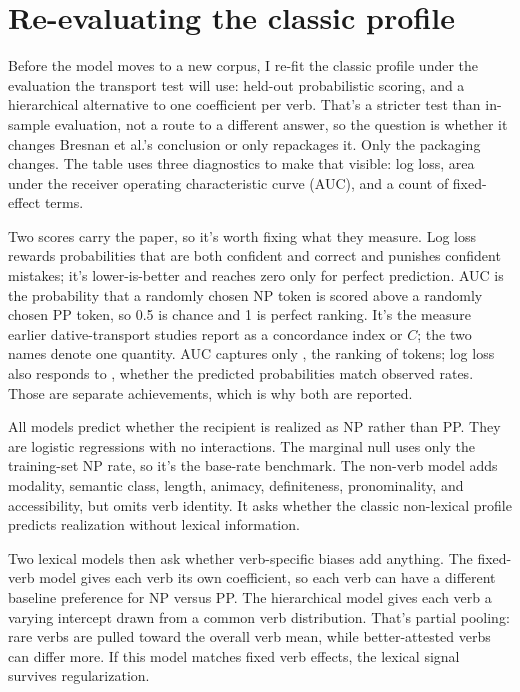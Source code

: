 \section{Re-evaluating the classic profile}

Before the model moves to a new corpus, I re-fit the classic profile under the
evaluation the transport test will use: held-out probabilistic scoring, and a
hierarchical alternative to one coefficient per verb. That's a stricter test than
in-sample evaluation, not a route to a different answer, so the question is
whether it changes Bresnan et al.'s conclusion or only repackages it. Only the
packaging changes. The table uses three diagnostics to make that visible: log
loss, area under the receiver operating characteristic curve (AUC), and a count
of fixed-effect terms.

Two scores carry the paper, so it's worth fixing what they measure. Log loss
rewards probabilities that are both confident and correct and punishes confident
mistakes; it's lower-is-better and reaches zero only for perfect prediction. AUC
is the probability that a randomly chosen NP token is scored above a randomly
chosen PP token, so 0.5 is chance and 1 is perfect ranking. It's the measure
earlier dative-transport studies report as a concordance index or \(C\); the two
names denote one quantity. AUC captures only , the ranking
of tokens; log loss also responds to , whether the predicted
probabilities match observed rates. Those are separate achievements, which is
why both are reported.

All models predict whether the recipient is realized as NP rather than PP. They
are logistic regressions with no interactions. The
marginal null uses only the training-set NP rate, so it's the base-rate
benchmark. The non-verb model adds modality, semantic class, length, animacy,
definiteness, pronominality, and accessibility, but omits verb identity. It asks
whether the classic non-lexical profile predicts realization without lexical
information.

Two lexical models then ask whether verb-specific biases add anything. The
fixed-verb model gives each verb its own coefficient, so each verb can have a
different baseline preference for NP versus PP. The hierarchical model gives
each verb a varying intercept drawn from a common verb distribution. That's
partial pooling: rare verbs are pulled toward the overall verb mean, while
better-attested verbs can differ more. If this model matches fixed verb effects,
the lexical signal survives regularization.

